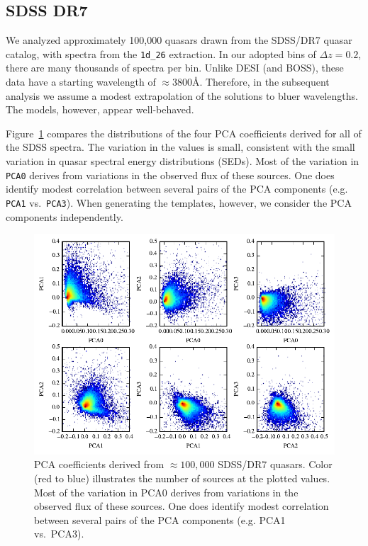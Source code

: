 \documentclass[11pt]{article}
\begin{document}
\subsection{SDSS DR7}\label{sec:sdss}

We analyzed approximately 100,000 quasars drawn from the SDSS/DR7
quasar catalog, with spectra from the {\tt 1d\_26} extraction.  In our
adopted bins of $\Delta z = 0.2$, there are many thousands of spectra
per bin.  Unlike DESI (and BOSS), these data have a starting
wavelength of $\approx 3800$\AA.  Therefore, in the subsequent
analysis we assume a modest extrapolation of the solutions to bluer
wavelengths.  The models, however, appear well-behaved.

Figure~\ref{fig:sdss_pca} compares the distributions of the four PCA
coefficients derived for all of the SDSS spectra.  The variation in
the values is small, consistent with the small variation in quasar
spectral energy distributions (SEDs). Most of the variation in {\tt
  PCA0} derives from variations in the observed flux of these sources.
One does identify modest correlation between several pairs of the PCA
components (e.g. {\tt PCA1} vs.\ {\tt PCA3}).  When generating the
templates, however, we consider the PCA components independently. 

\begin{figure}[h!]
  \vskip -0.1in
\begin{center}
  \includegraphics[width=5in]{figures/fig_sdss_pca.pdf}
\end{center}
 \vskip -0.20in
  \caption{\footnotesize PCA coefficients derived from $\approx
    100,000$ SDSS/DR7 quasars.  Color (red to blue) illustrates the
    number of sources at the plotted values.  Most of the variation in
    PCA0 derives from variations in the observed flux of these
    sources.  One does identify modest correlation between several
    pairs of the PCA components (e.g. PCA1 vs.\ PCA3).
  }\label{fig:sdss_pca}
\vskip -0.1in
\end{figure}
\end{document}
